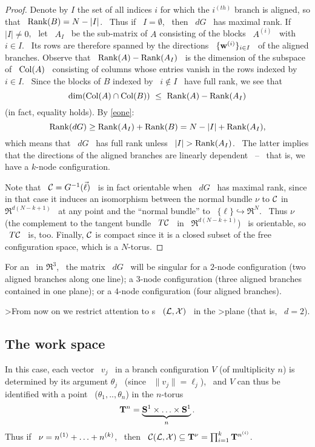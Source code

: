 \begin{proof}
Denote by $I$ the set of all indices $i$ for which the $i^{(th)}$
branch is aligned, so that \ $\operatorname{Rank}(B)=N-|I|$. \ Thus if \
$I=\emptyset$, \ then \ $dG$ \ has maximal rank. If \ $|I|\neq0$,
\ let \ $A_I$ \ be the sub-matrix of $A$ consisting of the blocks
\ $A^{(i)}$ \ with \ $i \in I$. \ Its rows are therefore spanned
by the directions \ $\{\mathbf{w}^{(i)}\}_{i\in I}$ \ of the aligned
branches. Observe that \ $\operatorname{Rank}(A)-\operatorname{Rank}(A_I)$ \ is the dimension
of the subspace of \ $\operatorname{Col}(A)$ \ consisting of columns whose
entries vanish in the rows indexed by \ $i\in I$. \ Since the
blocks of $B$ indexed by \ $i\not\in I$ \ have full rank, we see
that $$ \dim(\operatorname{Col}(A)\cap\operatorname{Col}(B))~\leq~\operatorname{Rank}(A)-\operatorname{Rank}(A_I)
$$
\noindent (in fact, equality holds). By \eqref{eone}:
$$
\operatorname{Rank}(dG)\geq\operatorname{Rank}(A_I)+\operatorname{Rank}(B)=N-|I|+\operatorname{Rank}(A_I),
$$
which means that \ $dG$ \ has full rank unless \ $|I|>\rank(A_I)$.
\ The latter implies that the directions of the aligned branches
are linearly dependent \ -- \ that is, we have a $k$-node
configuration.

Note that \ $\mathcal{C}=G^{-1}(\vec{\ell})$ \ is in fact orientable when \
$dG$ \ has maximal rank, since in that case it induces an
isomorphism between the normal bundle $\nu$ to $\mathcal{C}$ in \
$\Re^{d(N-k+1)}$ \ at any point and the ``normal bundle'' to \
$\{\ell\}\hookrightarrow\Re^{N}$. \ Thus $\nu$ (the complement to
the tangent bundle \ $T\mathcal{C}$ \ in \ $\Re^{d(N-k+1)}$) \ is
orientable, so  \ $T\mathcal{C}$ \  is, too. Finally, $\mathcal{C}$ is compact since
it is a closed subset of the free configuration space, which is a
$N$-torus. \end{proof}
\newnot{1-8}
\begin{remark}
%
For an \smech \ in $\Re^{3}$, \ the matrix \ $dG$ \ will be
singular for a $2$-node configuration (two aligned branches along
one line); a $3$-node configuration (three aligned branches
contained in one plane); or a $4$-node configuration (four aligned
branches).
%
\end{remark}

%
%
 \label{cplan}

>From now on we restrict attention to \smech s \ $(\mathcal{L},\mathcal{X})$ \ in the
>plane
(that is, \ $d=2$).

\subsection{The work space}
\label{sws}

In this case, each vector \ $v_j$ \ in a branch configuration $V$
(of multiplicity $n$) is determined by its argument $\theta_j$ \
(since \ $\|v_j\|=\ell_j$), \  and $V$ can thus be identified with
a point \ ($\theta_1,..,\theta_n$) in the $n$-torus \ $$
{\mathbf{T}^{n}}=\underbrace{{\mathbf{S}^{1}}\times \dotsc\times{\mathbf{S}^{1}}}_{n}. $$
\newnot{1-9} Thus if \ $\nu=n\sp{({1})}+\dotsc+n\sp{({k})}$, \ then \
$\mathcal{C}(\mathcal{L},\mathcal{X})\subseteq{\mathbf{T}^{\nu}}=\prod_{i=1}^{k}{\mathbf{T}^{n\sp{({i})}}}$.


